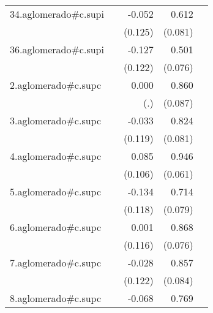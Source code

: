 {\begin{longtable}{l*{4}{D{.}{.}{-1}}}
\addlinespace
34.aglomerado#c.supi&                     &      -0.052         &       0.612\sym{***}&                     \\
            &                     &     (0.125)         &     (0.081)         &                     \\
\addlinespace
36.aglomerado#c.supi&                     &      -0.127         &       0.501\sym{***}&                     \\
            &                     &     (0.122)         &     (0.076)         &                     \\
\addlinespace
2.aglomerado#c.supc&                     &       0.000         &       0.860\sym{***}&                     \\
            &                     &         (.)         &     (0.087)         &                     \\
\addlinespace
3.aglomerado#c.supc&                     &      -0.033         &       0.824\sym{***}&                     \\
            &                     &     (0.119)         &     (0.081)         &                     \\
\addlinespace
4.aglomerado#c.supc&                     &       0.085         &       0.946\sym{***}&                     \\
            &                     &     (0.106)         &     (0.061)         &                     \\
\addlinespace
5.aglomerado#c.supc&                     &      -0.134         &       0.714\sym{***}&                     \\
            &                     &     (0.118)         &     (0.079)         &                     \\
\addlinespace
6.aglomerado#c.supc&                     &       0.001         &       0.868\sym{***}&                     \\
            &                     &     (0.116)         &     (0.076)         &                     \\
\addlinespace
7.aglomerado#c.supc&                     &      -0.028         &       0.857\sym{***}&                     \\
            &                     &     (0.122)         &     (0.084)         &                     \\
\addlinespace
8.aglomerado#c.supc&                     &      -0.068         &       0.769\sym{***}&                     \\

\end{longtable}}
